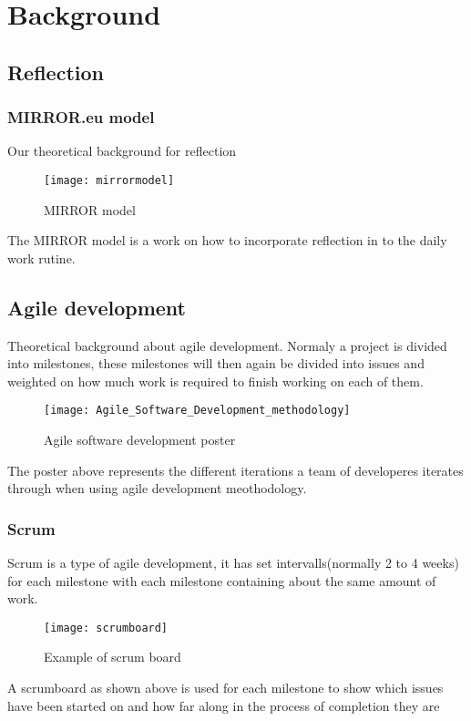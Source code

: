 \chapter{Background}

\section{Reflection}

\subsection{MIRROR.eu model}
Our theoretical background for reflection
\begin{figure}[h!]
\label{logo}
\centering
	\texttt{[image: mirrormodel]}
\caption{MIRROR model}
\end{figure}
The MIRROR model is a work on how to incorporate reflection in to the daily work rutine.


\section{Agile development}
Theoretical background about agile development. Normaly a project is divided into milestones, these milestones will then again be divided into issues and weighted on how much work is required to finish working on each of them.

\begin{figure}[h!]
\label{logo}
\centering
	\texttt{[image: Agile\_Software\_Development\_methodology]}
\caption{Agile software development poster}
\end{figure}

The poster above represents the different iterations a team of developeres iterates through when using agile development meothodology.

\subsection{Scrum}
Scrum is a type of agile development, it has set intervalls(normally 2 to 4 weeks) for each milestone with each milestone containing about the same amount of work.

\begin{figure}[h!]
\label{logo}
\centering
	\texttt{[image: scrumboard]}
\caption{Example of scrum board}
\end{figure}

A scrumboard as shown above is used for each milestone to show which issues have been started on and how far along in the process of completion they are